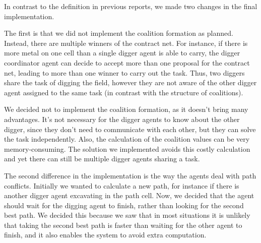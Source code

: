 In contrast to the definition in previous reports, we made two changes in the final implementation.

The first is that we did not implement the coalition formation as planned. Instead, there are multiple winners of the contract net. For instance, if there is more metal on one cell than a single digger agent is able to carry, the digger coordinator agent can decide to accept more than one proposal for the contract net, leading to more than one winner to carry out the task. Thus, two diggers share the task of digging the field, however they are not aware of the other digger agent assigned to the same task (in contrast with the structure of coalitions).

We decided not to implement the coalition formation, as it doesn't bring many advantages.  It's not necessary for the digger agents to know about the other digger, since they don't need to communicate with each other, but they can solve the task independently. Also, the calculation of the coalition values can be very memory-consuming. The solution we implemented avoids this costly calculation and yet there can still be multiple digger agents sharing a task.

The second difference in the implementation is the way the agents deal with path conflicts. Initially we wanted to calculate a new path, for instance if there is another digger agent excavating in the path cell. Now, we decided that the agent should wait for the digging agent to finish, rather than looking for the second best path. We decided this because we saw that in most situations it is unlikely that taking the second best path is faster than waiting for the other agent to finish, and it also enables the system to avoid extra computation.


